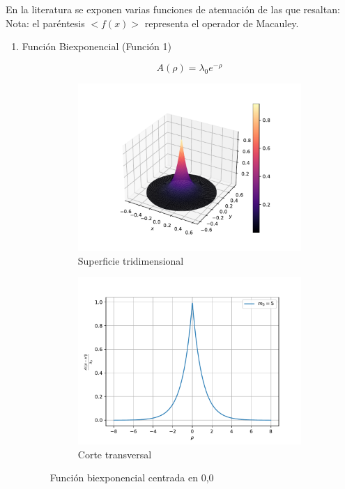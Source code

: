 En la literatura se exponen varias funciones de atenuación de las que resaltan:
Nota: el paréntesis $<f(x)>$ representa el operador de Macauley.
\begin{enumerate}
	\item Función Biexponencial (Función 1)

	\begin{equation}
		A(\rho)=\lambda_0e^{-\rho}
	\end{equation}
	\begin{figure}
	    \centering
	    \sffamily
	    \begin{subfigure}{0.45\textwidth}
	    \centering
	        \includegraphics[width=\textwidth]{figuras/biexp3d.pdf}
	        \caption{Superficie tridimensional}
	        \label{fig:biexponencial.3d}
	    \end{subfigure}
	    \begin{subfigure}{0.45\textwidth}
	    \centering
	        \includegraphics[width=\textwidth]{figuras/biexp2d.pdf}
	        \caption{Corte transversal}
	        \label{fig:biexponencial.2d}
	    \end{subfigure}
	    \caption{Función biexponencial centrada en 0,0}
	    \label{fig:biexponencial}
	\end{figure}


\end{enumerate}
